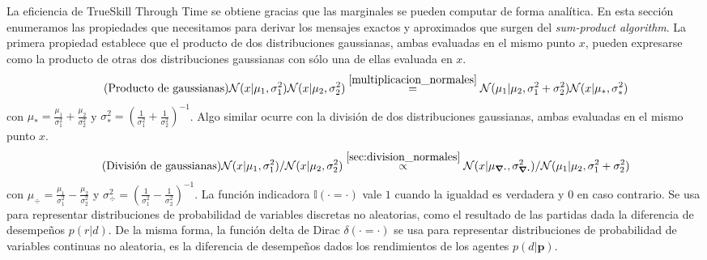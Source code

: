 \documentclass[a4paper,11pt]{book}
\newcommand{\N}{\mathcal{N}}
\theoremstyle{definition}
\newif\ifen
\newcommand{\en}[1]{\ifen#1\fi}
\begin{document}
La eficiencia de TrueSkill Through Time se obtiene gracias que las marginales se pueden computar de forma analítica.
%
En esta sección enumeramos las propiedades que necesitamos para derivar los mensajes exactos y aproximados que surgen del \emph{sum-product algorithm}.
%
La primera propiedad establece que el producto de dos distribuciones gaussianas, ambas evaluadas en el mismo punto $x$, pueden expresarse como la producto de otras dos distribuciones gaussianas con sólo una de ellas evaluada en $x$.
%
\begin{equation*}\label{eq:gaussian_product} \tag{\text{Producto de gaussianas}}
\N(x|\mu_1,\sigma_1^2)\N(x|\mu_2,\sigma_2^2) \overset{\ref{multiplicacion_normales}}{=} \N(\mu_1|\mu_2,\sigma_1^2+\sigma_2^2) \N(x|\mu_{*},\sigma_{*}^2)
\end{equation*}
%
con $\mu_{*} = \frac{\mu_1}{\sigma_1^2} + \frac{\mu_2}{\sigma_2^2}$ y $\sigma_{*}^2 = \left(\frac{1}{\sigma_1^2} + \frac{1}{\sigma_2^2} \right)^{-1}$.
%
Algo similar ocurre con la división de dos distribuciones gaussianas, ambas evaluadas en el mismo punto $x$.
\begin{equation*}\label{eq:gaussian_division} \tag{\text{División de gaussianas}}
\N(x|\mu_1,\sigma_1^2)/\N(x|\mu_2,\sigma_2^2) \overset{\ref{sec:division_normales}}{\propto} \N(x|\mu_{\div},\sigma_{\div}^2)/\N(\mu_1|\mu_2,\sigma_1^2+\sigma_2^2)
\end{equation*}
%
con $\mu_{\div} = \frac{\mu_1}{\sigma_1^2} - \frac{\mu_2}{\sigma_2^2}$ y $\sigma_{\div}^2 = \left(\frac{1}{\sigma_1^2} - \frac{1}{\sigma_2^2} \right)^{-1}$.
La función indicadora $\mathbb{I}(\cdot=\cdot)$ vale $1$ cuando la igualdad es verdadera y $0$ en caso contrario.
%
%
Se usa para representar distribuciones de probabilidad de variables discretas no aleatorias, como el resultado de las partidas dada la diferencia de desempeños $p(r|d)$.
%
De la misma forma, la función delta de Dirac $\delta(\cdot=\cdot)$ se usa para representar distribuciones de probabilidad de variables continuas no aleatoria, es la diferencia de desempeños dados los rendimientos de los agentes $p(d|\bm{p})$.
\end{document}
